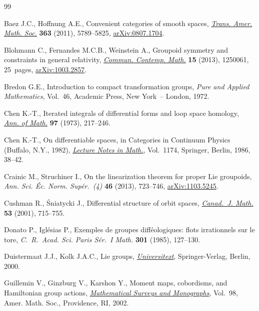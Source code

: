 \documentclass[pdftex]{sigma}
\numberwithin{equation}{section}
\begin{document}
\begin{thebibliography}{99}
\footnotesize\itemsep=0pt

Baez J.C., Hof\/fnung A.E., Convenient categories of smooth spaces,
 \href{http://dx.doi.org/10.1090/S0002-9947-2011-05107-X}{\textit{Trans. Amer. Math. Soc.}} \textbf{363} (2011), 5789--5825,
 \href{http://arxiv.org/abs/0807.1704}{arXiv:0807.1704}.

Blohmann C., Fernandes M.C.B., Weinstein A., Groupoid symmetry and constraints
 in general relativity, \href{http://dx.doi.org/10.1142/S0219199712500617}{\textit{Commun. Contemp. Math.}} \textbf{15} (2013),
 1250061, 25~pages, \href{http://arxiv.org/abs/1003.2857}{arXiv:1003.2857}.

Bredon G.E., Introduction to compact transformation groups, \textit{Pure and Applied Mathematics}, Vol.~46, Academic
 Press, New York~-- London, 1972.

Chen K.-T., Iterated integrals of dif\/ferential forms and loop space homology,
 \href{http://dx.doi.org/10.2307/1970846}{\textit{Ann. of Math.}} \textbf{97} (1973), 217--246.

Chen K.-T., On dif\/ferentiable spaces, in Categories in Continuum Physics
 ({B}uf\/falo, {N}.{Y}., 1982), \href{http://dx.doi.org/10.1007/BFb0076932}{\textit{Lecture Notes in Math.}}, Vol.~1174,
 Springer, Berlin, 1986, 38--42.

Crainic M., Struchiner I., On the linearization theorem for proper {L}ie
 groupoids, \textit{Ann. Sci. \'Ec. Norm. Sup\'er.~(4)} \textbf{46} (2013),
 723--746, \href{http://arxiv.org/abs/1103.5245}{arXiv:1103.5245}.

Cushman R., {\'S}niatycki J., Dif\/ferential structure of orbit spaces,
 \href{http://dx.doi.org/10.4153/CJM-2001-029-1}{\textit{Canad.~J. Math.}} \textbf{53} (2001), 715--755.

Donato P., Igl{\'e}sias P., Exemples de groupes dif\/f\'eologiques: f\/lots
 irrationnels sur le tore, \textit{C.~R.~Acad. Sci. Paris S\'er.~I Math.}
 \textbf{301} (1985), 127--130.

Duistermaat J.J., Kolk J.A.C., Lie groups, \href{http://dx.doi.org/10.1007/978-3-642-56936-4}{\textit{Universitext}}, Springer-Verlag,
 Berlin, 2000.

Guillemin V., Ginzburg V., Karshon Y., Moment maps, cobordisms, and
 {H}amiltonian group actions, \href{http://dx.doi.org/10.1090/surv/098}{\textit{Mathematical Surveys and Monographs}},
 Vol.~98, Amer. Math. Soc., Providence, RI, 2002.


\end{thebibliography}
\end{document}
